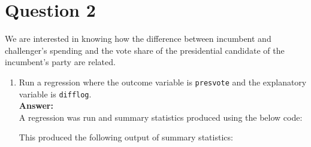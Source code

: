 \documentclass[12pt,letterpaper]{article}
\begin{document}
\section*{Question 2}
\noindent We are interested in knowing how the difference between incumbent and challenger's spending and the vote share of the presidential candidate of the incumbent's party are related.	\vspace{.25cm}
	\begin{enumerate}
		\item Run a regression where the outcome variable is \texttt{presvote} and the explanatory variable is \texttt{difflog}.\\
		
		\textbf{Answer:}\\
		
		A regression was run and summary statistics produced using the below code:
		
		\vspace{.5cm}
		
		  
		
		\vspace{.5cm}
		
		This produced the following output of summary statistics:
		
		\vspace{.5cm}
		

\end{enumerate}
\end{document}
